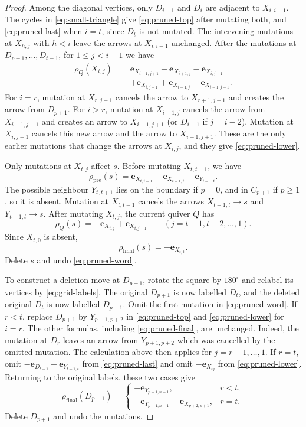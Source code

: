 \documentclass[12pt, letter]{amsart}
\theoremstyle{definition}
\numberwithin{equation}{section}
\begin{document}
\begin{proof}
Among the diagonal vertices, only $D_{i-1}$ and $D_i$ are adjacent to $X_{i,i-1}$.
The cycles in \eqref{eq:small-triangle} give \eqref{eq:pruned-top}
after mutating both, and \eqref{eq:pruned-last} when $i=t$, since $D_t$ is not mutated.
The intervening mutations at $X_{h,j}$ with $h<i$ leave the arrows at $X_{i,i-1}$ unchanged.
After the mutations at $D_{p+1},\ldots,D_{t-1}$, for $1\le j<i-1$ we have
\[
 \begin{aligned}
 \rho_Q(X_{i,j})={}&\mathbf e_{X_{i+1,j+1}}-\mathbf e_{X_{i+1,j}}
 -\mathbf e_{X_{i,j+1}}\\
 &+\mathbf e_{X_{i,j-1}}+\mathbf e_{X_{i-1,j}}
 -\mathbf e_{X_{i-1,j-1}}.
 \end{aligned}
\]
For $i=r$, mutation at $X_{r,j+1}$ cancels the arrow
to $X_{r+1,j+1}$ and creates the arrow from $D_{p+1}$.
For $i>r$, mutation at $X_{i-1,j}$ cancels the arrow from $X_{i-1,j-1}$
and creates an arrow to $X_{i-1,j+1}$ (or $D_{i-1}$ if $j=i-2$).
Mutation at $X_{i,j+1}$ cancels this new arrow and the arrow to $X_{i+1,j+1}$.
These are the only earlier mutations that change the arrows at $X_{i,j}$,
and they give \eqref{eq:pruned-lower}.

Only mutations at $X_{t,j}$ affect $s$.
Before mutating $X_{t,t-1}$, we have
\[
 \rho_{\mathrm{pre}}(s)=\mathbf e_{X_{t,t-1}}-\mathbf e_{X_{t+1,t}}
                              -\mathbf e_{Y_{t-1,t}}.
\]
The possible neighbour $Y_{t,t+1}$ lies on the boundary
if $p=0$, and in $C_{p+1}$ if $p\ge1$, so it is absent.
Mutation at $X_{t,t-1}$ cancels the arrows $X_{t+1,t}\to s$ and $Y_{t-1,t}\to s$.
After mutating $X_{t,j}$, the current quiver $Q$ has
\[
 \rho_Q(s)=-\mathbf e_{X_{t,j}}+\mathbf e_{X_{t,j-1}}
 \qquad(j=t-1,t-2,\ldots,1).
\]
Since $X_{t,0}$ is absent,
\begin{equation}\label{eq:pruned-final}
 \rho_{\mathrm{final}}(s)=-\mathbf e_{X_{t,1}}.
\end{equation}
Delete $s$ and undo \eqref{eq:pruned-word}.

To construct a deletion move at $D_{p+1}$, rotate the square by $180^\circ$
and relabel its vertices by \eqref{eq:grid-labels}.
The original $D_{p+1}$ is now labelled $D_t$, and the deleted original $D_t$
is now labelled $D_{p+1}$. Omit the first mutation in \eqref{eq:pruned-word}.
If $r<t$, replace $D_{p+1}$ by $Y_{p+1,p+2}$ in
\eqref{eq:pruned-top} and \eqref{eq:pruned-lower} for $i=r$.
The other formulas, including \eqref{eq:pruned-final}, are unchanged.
Indeed, the mutation at $D_r$ leaves an arrow from $Y_{p+1,p+2}$
which was cancelled by the omitted mutation.
The calculation above then applies for $j=r-1,\ldots,1$.
If $r=t$, omit
$-\mathbf e_{D_{t-1}}+\mathbf e_{Y_{t-1,t}}$
from \eqref{eq:pruned-last} and omit $-\mathbf e_{K_{tj}}$
from \eqref{eq:pruned-lower}.
Returning to the original labels, these two cases give
\[
 \rho_{\mathrm{final}}(D_{p+1})=
 \begin{cases}
 -\mathbf e_{Y_{p+1,n-1}},&r<t,\\
 -\mathbf e_{Y_{p+1,n-1}}-\mathbf e_{X_{p+2,p+1}},&r=t.
 \end{cases}
\]
Delete $D_{p+1}$ and undo the mutations.
\end{proof}
\end{document}
